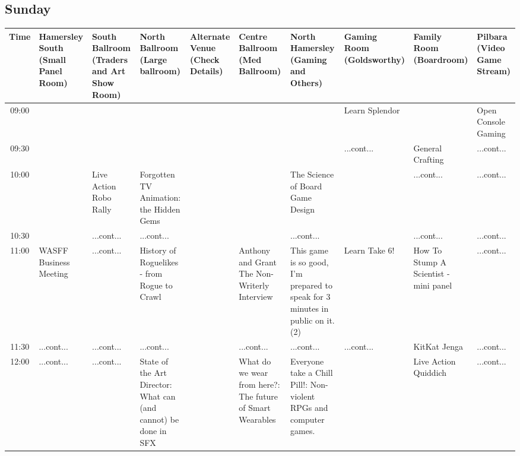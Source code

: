 \documentclass{scrreprt}
\begin{document}
\begin{landscape}
\subsection*{Sunday}\tiny
\begin{tabular}{c||p{25mm}|p{25mm}|p{25mm}|p{25mm}|p{25mm}|p{25mm}|p{25mm}|p{25mm}|p{25mm}|}
Time&Hamersley South (Small Panel Room)&South Ballroom (Traders and Art Show Room)&North Ballroom (Large ballroom)&Alternate Venue (Check Details)&Centre Ballroom (Med Ballroom)&North Hamersley (Gaming and Others)&Gaming Room (Goldsworthy)&Family Room (Boardroom)&Pilbara (Video Game Stream)\\
\hline
\hline
09:00&&&&&&&\cellcolor[gray]{0.668433} Learn Splendor&&\cellcolor[gray]{0.511053} Open Console Gaming\\
09:30&&&&&&&\cellcolor[gray]{0.668433} ...cont...&\cellcolor[gray]{0.856313} General Crafting&\cellcolor[gray]{0.511053} ...cont...\\
10:00&&\cellcolor[gray]{0.822766} Live Action Robo Rally&\cellcolor[gray]{0.849320} Forgotten TV Animation: the Hidden Gems&&&\cellcolor[gray]{0.631774} The Science of Board Game Design&&\cellcolor[gray]{0.856313} ...cont...&\cellcolor[gray]{0.511053} ...cont...\\
10:30&&\cellcolor[gray]{0.822766} ...cont...&\cellcolor[gray]{0.849320} ...cont...&&&\cellcolor[gray]{0.631774} ...cont...&&\cellcolor[gray]{0.856313} ...cont...&\cellcolor[gray]{0.511053} ...cont...\\
11:00&\cellcolor[gray]{0.959563} WASFF Business Meeting&\cellcolor[gray]{0.822766} ...cont...&\cellcolor[gray]{0.744805} History of Roguelikes - from Rogue to Crawl&&\cellcolor[gray]{0.991689} Anthony and Grant The Non-Writerly Interview&\cellcolor[gray]{0.537026} This game is so good, I'm prepared to speak for 3 minutes in public on it. (2)&\cellcolor[gray]{0.891836} Learn Take 6!&\cellcolor[gray]{0.772113} How To Stump A Scientist - mini panel&\cellcolor[gray]{0.511053} ...cont...\\
11:30&\cellcolor[gray]{0.959563} ...cont...&\cellcolor[gray]{0.822766} ...cont...&\cellcolor[gray]{0.744805} ...cont...&&\cellcolor[gray]{0.991689} ...cont...&\cellcolor[gray]{0.537026} ...cont...&\cellcolor[gray]{0.891836} ...cont...&\cellcolor[gray]{0.501076} KitKat Jenga&\cellcolor[gray]{0.511053} ...cont...\\
12:00&\cellcolor[gray]{0.959563} ...cont...&\cellcolor[gray]{0.822766} ...cont...&\cellcolor[gray]{0.536849} State of the Art Director: What can (and cannot) be done in SFX&&\cellcolor[gray]{0.652774} What do we wear from here?: The future of Smart Wearables&\cellcolor[gray]{0.921723} Everyone take a Chill Pill!: Non-violent RPGs and computer games.&&\cellcolor[gray]{0.933248} Live Action Quiddich&\cellcolor[gray]{0.511053} ...cont...\\

\end{tabular}
\end{landscape}
\end{document}
